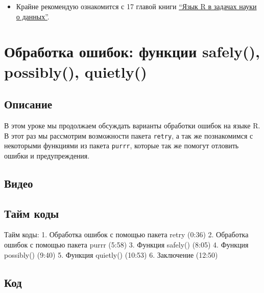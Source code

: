 \documentclass[
]{book}
\providecommand{\tightlist}{%
  \setlength{\itemsep}{0pt}\setlength{\parskip}{0pt}}
\begin{document}
\begin{itemize}
\tightlist
\item
  Крайне рекомендую ознакомится с 17 главой книги \href{http://www.williamspublishing.com/Books/978-5-9909446-8-8.html}{``Язык R в задачах науки о данных''}.
\end{itemize}

\hypertarget{ux43eux431ux440ux430ux431ux43eux442ux43aux430-ux43eux448ux438ux431ux43eux43a-ux444ux443ux43dux43aux446ux438ux438-safely-possibly-quietly}{%
\chapter{Обработка ошибок: функции safely(), possibly(), quietly()}\label{ux43eux431ux440ux430ux431ux43eux442ux43aux430-ux43eux448ux438ux431ux43eux43a-ux444ux443ux43dux43aux446ux438ux438-safely-possibly-quietly}}

\hypertarget{ux43eux43fux438ux441ux430ux43dux438ux435-4}{%
\section{Описание}\label{ux43eux43fux438ux441ux430ux43dux438ux435-4}}

В этом уроке мы продолжаем обсуждать варианты обработки ошибок на языке R. В этот раз мы рассмотрим возможности пакета \texttt{retry}, а так же познакомимся с некоторыми функциями из пакета \texttt{purrr}, которые так же помогут отловить ошибки и предупреждения.

\hypertarget{ux432ux438ux434ux435ux43e-4}{%
\section{Видео}\label{ux432ux438ux434ux435ux43e-4}}

\hypertarget{ux442ux430ux439ux43c-ux43aux43eux434ux44b-4}{%
\section{Тайм коды}\label{ux442ux430ux439ux43c-ux43aux43eux434ux44b-4}}

Тайм коды:
1. Обработка ошибок с помощью пакета retry (0:36)
2. Обработка ошибок с помощью пакета purrr (5:58)
3. Функция safely() (8:05)
4. Функция possibly() (9:40)
5. Функция quietly() (10:53)
6. Заключение (12:50)

\hypertarget{ux43aux43eux434-4}{%
\section{Код}\label{ux43aux43eux434-4}}
\end{document}
